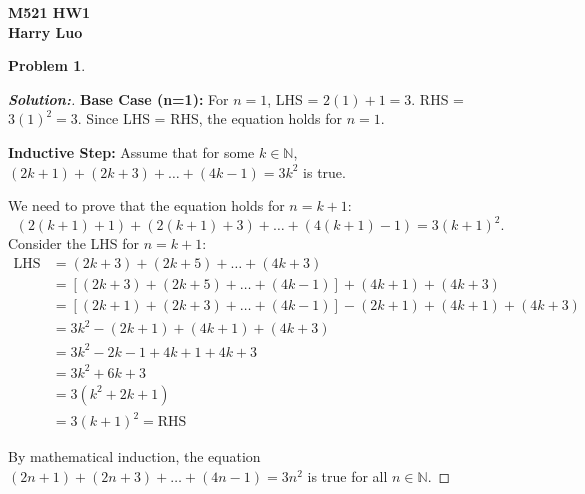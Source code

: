 \documentclass[12pt]{article}
\theoremstyle{definition}\newtheorem{problem}{Problem}
\newenvironment{solution}{\begin{proof}[\bfseries\textup{Solution:}]}{\end{proof}}
\begin{document}

\begin{center}
\bfseries M521 HW1\\ Harry Luo%
 
\end{center}

\begin{problem}

\end{problem}
\begin{solution}


    
 \textbf{Base Case (n=1):}
       For $n=1$, LHS = $2(1)+1 = 3$. RHS = $3(1)^2 = 3$.
       Since LHS = RHS, the equation holds for $n=1$.
    
 \textbf{Inductive Step:}
       Assume that for some $k \in \mathbb{N}$, $(2k+1) + (2k+3) + \ldots + (4k-1) = 3k^2$ is true.

       We need to prove that the equation holds for $n=k+1$:
       $$(2(k+1)+1) + (2(k+1)+3) + \ldots + (4(k+1)-1) = 3(k+1)^2.$$
       Consider the LHS for $n=k+1$:
       \begin{align*}
       \text{LHS} &= (2k+3) + (2k+5) + \ldots + (4k+3) \\
             &= [(2k+3) + (2k+5) + \ldots + (4k-1)] + (4k+1) + (4k+3) \\
             &= [(2k+1) + (2k+3) + \ldots + (4k-1)] - (2k+1) + (4k+1) + (4k+3) \\
             &= 3k^2 - (2k+1) + (4k+1) + (4k+3) \\
             &= 3k^2 - 2k - 1 + 4k + 1 + 4k + 3 \\
             &= 3k^2 + 6k + 3 \\
             &= 3(k^2 + 2k + 1) \\
             &= 3(k+1)^2 = \text{RHS}
       \end{align*}
       
    
       By mathematical induction, the equation $(2n+1) + (2n+3) + \ldots + (4n-1) = 3n^2$ is true for all $n \in \mathbb{N}$.
\end{solution}
\end{document}

